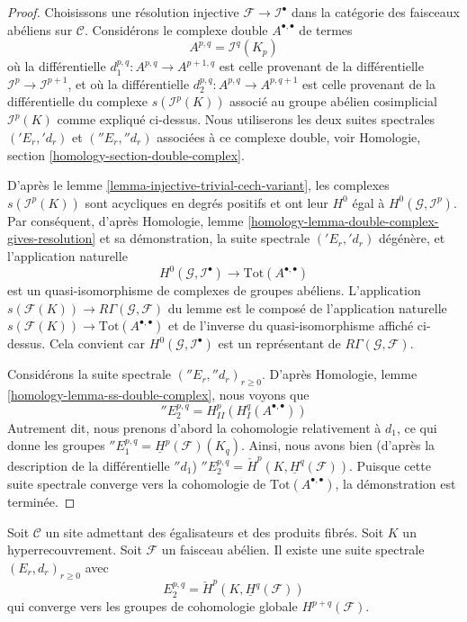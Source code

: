 \begin{proof}
Choisissons une résolution injective $\mathcal{F} \to \mathcal{I}^\bullet$
dans la catégorie des faisceaux abéliens sur $\mathcal{C}$. Considérons le
complexe double $A^{\bullet, \bullet}$ de termes
$$
A^{p, q} = \mathcal{I}^q(K_p)
$$
où la différentielle $d_1^{p, q} : A^{p, q} \to A^{p + 1, q}$
est celle provenant de la différentielle $\mathcal{I}^p \to \mathcal{I}^{p + 1}$,
et où la différentielle $d_2^{p, q} : A^{p, q} \to A^{p, q + 1}$ est
celle provenant de la différentielle du complexe
$s(\mathcal{I}^p(K))$ associé au groupe abélien cosimplicial
$\mathcal{I}^p(K)$ comme expliqué ci-dessus.
Nous utiliserons les deux suites
spectrales $({}'E_r, {}'d_r)$ et $({}''E_r, {}''d_r)$
associées à ce complexe double, voir
Homologie, section \ref{homology-section-double-complex}.

\medskip\noindent
D'après le lemme \ref{lemma-injective-trivial-cech-variant}, les complexes
$s(\mathcal{I}^p(K))$ sont acycliques en degrés positifs et ont
leur $H^0$ égal à $H^0(\mathcal{G}, \mathcal{I}^p)$. Par conséquent, d'après
Homologie, lemme \ref{homology-lemma-double-complex-gives-resolution}
et sa démonstration, la suite spectrale $({}'E_r, {}'d_r)$ dégénère,
et l'application naturelle
$$
H^0(\mathcal{G}, \mathcal{I}^\bullet) \longrightarrow
\text{Tot}(A^{\bullet, \bullet})
$$
est un quasi-isomorphisme de complexes de groupes abéliens. L'application
$s(\mathcal{F}(K)) \longrightarrow R\Gamma(\mathcal{G}, \mathcal{F})$
du lemme est le composé de l'application naturelle
$s(\mathcal{F}(K)) \to \text{Tot}(A^{\bullet, \bullet})$
et de l'inverse du quasi-isomorphisme affiché ci-dessus.
Cela convient car $H^0(\mathcal{G}, \mathcal{I}^\bullet)$
est un représentant de $R\Gamma(\mathcal{G}, \mathcal{F})$.

\medskip\noindent
Considérons la suite spectrale $({}''E_r, {}''d_r)_{r \geq 0}$. D'après
Homologie, lemme \ref{homology-lemma-ss-double-complex},
nous voyons que
$$
{}''E_2^{p, q} = H^p_{II}(H^q_I(A^{\bullet, \bullet}))
$$
Autrement dit, nous prenons d'abord la cohomologie relativement à
$d_1$, ce qui donne les groupes
${}''E_1^{p, q} = \underline{H}^p(\mathcal{F})(K_q)$.
Ainsi, nous avons bien (d'après la description de la différentielle
${}''d_1$)
${}''E_2^{p, q} = \check{H}^p(K, \underline{H}^q(\mathcal{F}))$.
Puisque cette suite spectrale converge vers la cohomologie de
$\text{Tot}(A^{\bullet, \bullet})$, la démonstration est terminée.
\end{proof}

\begin{lemma}
\label{lemma-cech-spectral-sequence-verdier}
Soit $\mathcal{C}$ un site admettant des égalisateurs et des produits fibrés.
Soit $K$ un hyperrecouvrement.
Soit $\mathcal{F}$ un faisceau abélien. Il existe une
suite spectrale $(E_r, d_r)_{r \geq 0}$ avec
$$
E_2^{p, q} = \check{H}^p(K, \underline{H}^q(\mathcal{F}))
$$
qui converge vers les groupes de cohomologie globale $H^{p + q}(\mathcal{F})$.
\end{lemma}

